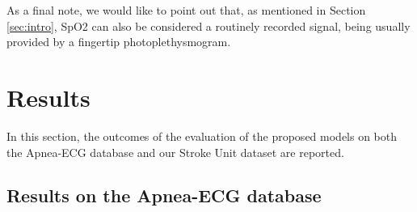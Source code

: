 \documentclass[5p,twocolumn,lefttitle]{elsarticle}
\begin{document}
As a final note, we would like to point out that, as mentioned in Section \ref{sec:intro},  SpO2 can also be considered a routinely recorded signal, being usually provided by a fingertip photoplethysmogram.






\section{Results}
\label{sec:res}

In this section, the outcomes of the evaluation of the proposed models on both the Apnea-ECG database and our Stroke Unit dataset are reported.

\subsection{Results on the Apnea-ECG database}
\end{document}
